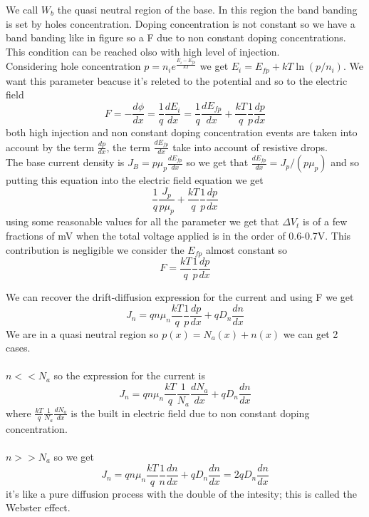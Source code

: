 We call $W_b$ the quasi neutral region of the base. In this region the band banding is set by holes concentration. Doping concentration is not constant so we have a band banding like in figure so a F due to non constant doping concentrations. This condition can be reached olso with high level of injection.\\
Considering hole concentration $p=n_ie^{\frac{E_i-E_{fp}}{kT}}$ we get $E_i=E_{fp}+kT\ln(p/n_i)$. We want this parameter beacuse it's releted to the potential and so to the electric field
\begin{equation}
F=-\frac{d\phi}{dx}=\frac{1}{q}\frac{dE_{i}}{dx}=\frac{1}{q}\frac{dE_{fp}}{dx}+\frac{kT}{q}\frac{1}{p}\frac{dp}{dx}
\end{equation}
both high injection and non constant doping concentration events are taken into account by the term $\frac{dp}{dx}$, the term $\frac{dE_{fp}}{dx}$ take into account of resistive drops.\\
\vspace{5mm}
The base current density is $J_B=p\mu_p \frac{dE_{fp}}{dx}$ so we get that $\frac{dE_{fp}}{dx}=J_p/(p\mu_p)$ and so putting this equation into the electric field equation we get 
\begin{equation}
\frac{1}{q}\frac{J_p}{p\mu_p}+\frac{kT}{q}\frac{1}{p}\frac{dp}{dx}
\end{equation}
using some reasonable values for all the parameter we get that $\Delta V_t$ is of a few fractions of mV when the total voltage applied is in the order of 0.6-0.7V. This contribution is negligible we consider the $E_{fp}$ almost constant so 
\begin{equation}
F=\frac{kT}{q}\frac{1}{p}\frac{dp}{dx}
\end{equation}

\vspace{5mm}
We can recover the drift-diffusion expression for the current and using F we get
\begin{equation}
J_n=qn\mu_n \frac{kT}{q}\frac{1}{p}\frac{dp}{dx}+qD_n \frac{dn}{dx}
\end{equation}
We are in a quasi neutral region so $p(x)=N_a(x)+n(x)$ we can get 2 cases.\\
\vspace{3mm}
\\
$n<<N_a$ so the expression for the current is 
\begin{equation}
J_n=qn\mu_n \frac{kT}{q}\frac{1}{N_a}\frac{dN_a}{dx}+qD_n \frac{dn}{dx}
\end{equation}
where $\frac{kT}{q}\frac{1}{N_a}\frac{dN_a}{dx}$ is the built in electric field due to non constant doping concentration.\\
\vspace{3mm}
\\
$n>>N_a$ so we get 
\begin{equation}
J_n=qn\mu_n \frac{kT}{q}\frac{1}{n}\frac{dn}{dx}+qD_n \frac{dn}{dx}=2qD_n\frac{dn}{dx}
\end{equation}
it's like a pure diffusion process with the double of the intesity; this is called the Webster effect.\\


